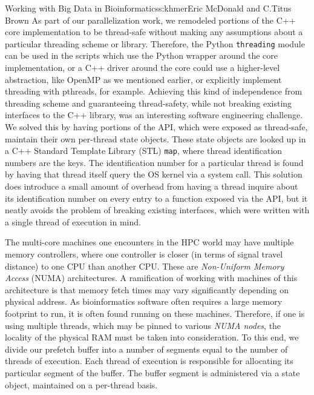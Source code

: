 \begin{aosachapter}{Working with Big Data in Bioinformatics}{s:khmer}{Eric McDonald and C.\/Titus Brown}
As part of our parallelization work, we remodeled portions of the C++
core implementation to be thread-safe without making any assumptions
about a particular threading scheme or library. Therefore, the Python
\texttt{threading} module can be used in the scripts which use the
Python wrapper around the core implementation, or a C++ driver around
the core could use a higher-level abstraction, like OpenMP as we
mentioned earlier, or explicitly implement threading with pthreads, for
example. Achieving this kind of independence from threading scheme and
guaranteeing thread-safety, while not breaking existing interfaces to
the C++ library, was an interesting software engineering challenge. We
solved this by having portions of the API, which were exposed as
thread-safe, maintain their own per-thread state objects. These state
objects are looked up in a C++ Standard Template Library (STL)
\texttt{map}, where thread identification numbers are the keys. The
identification number for a particular thread is found by having that
thread itself query the OS kernel via a system call. This solution does
introduce a small amount of overhead from having a thread inquire about
its identification number on every entry to a function exposed via the
API, but it neatly avoids the problem of breaking existing interfaces,
which were written with a single thread of execution in mind.


The multi-core machines one encounters in the HPC world may have
multiple memory controllers, where one controller is closer (in terms of
signal travel distance) to one CPU than another CPU. These are
\emph{Non-Uniform Memory Access} (NUMA) architectures. A ramification of
working with machines of this architecture is that memory fetch times
may vary significantly depending on physical address. As bioinformatics
software often requires a large memory footprint to run, it is often
found running on these machines. Therefore, if one is using multiple
threads, which may be pinned to various \emph{NUMA nodes}, the locality
of the physical RAM must be taken into consideration. To this end, we
divide our prefetch buffer into a number of segments equal to the number
of threads of execution. Each thread of execution is responsible for
allocating its particular segment of the buffer. The buffer segment is
administered via a state object, maintained on a per-thread basis.



\end{aosachapter}
